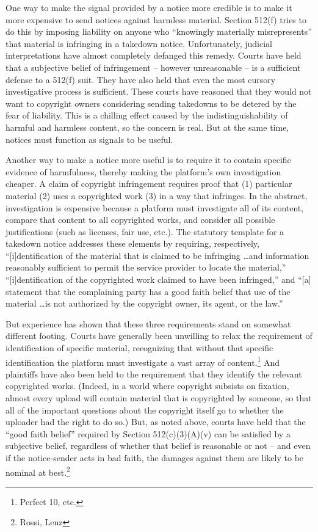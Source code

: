 One way to make the signal provided by a notice more credible is to make it more expensive to send notices against harmless material. Section 512(f) tries to do this by imposing liability on anyone who ``knowingly materially misrepresents'' that material is infringing in a takedown notice. Unfortunately, judicial interpretations have almost completely defanged this remedy. Courts have held that a subjective belief of infringement -- however unreasonable -- is a sufficient defense to a 512(f) suit. They have also held that even the most cursory investigative process is sufficient. These courts have reasoned that they would not want to copyright owners considering sending takedowns to be detered by the fear of liability. This is a chilling effect caused by the indistinguishability of harmful and harmless content, so the concern is real. But at the same time, notices must function as signals to be useful.

Another way to make a notice more useful is to require it to contain specific evidence of harmfulness, thereby making the platform's own investigation cheaper. A claim of copyright infringement requires proof that (1) particular material (2) uses a copyrighted work (3) in a way that infringes. In the abstract, investigation is expensive because a platform must investigate all of its content, compare that content to all copyrighted works, and consider all possible justifications (such as licenses, fair use, etc.).  The statutory template for a takedown notice addresses these elements by requiring, respectively, ``[i]dentification of the material that is claimed to be infringing \ldots and information reasonably sufficient to permit the service provider to locate the material,'' ``[i]dentification of the copyrighted work claimed to have been infringed,'' and ``[a] statement that the complaining party has a good faith belief that use of the material \ldots  is not authorized by the copyright owner, its agent, or the law.''

But experience has shown that these three requirements stand on somewhat different footing. Courts have generally been unwilling to relax the requirement of identification of specific material, recognizing that without that specific identification the platform must investigate a vast array of content.\footnote{Perfect 10, etc.} And plaintiffs have also been held to the requirement that they identify the relevant copyrighted works. (Indeed, in a world where copyright subsists on fixation, almost every upload will contain material that is copyrighted by someone, so that all of the important questions about the copyright itself go to whether the uploader had the right to do so.) But, as noted above, courts have held that the ``good faith belief'' required by Section 512(c)(3)(A)(v) can be satisfied by a subjective belief, regardless of whether that belief is reasonable or not -- and even if the notice-sender acts in bad faith, the damages against them are likely to be nominal at best.\footnote{Rossi, Lenz} 

